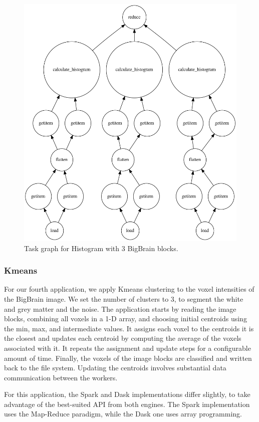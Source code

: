 \documentclass[conference]{IEEEtran}
\begin{document}
\begin{figure}[!hb]
	\centering
	\includegraphics[height=\columnwidth,
	angle=0]{figures/histogram.png}
	\caption{Task graph for Histogram with 3 BigBrain blocks.}
	\label{fig:graph-histogram}
\end{figure}
	
\subsubsection{Kmeans}
For our fourth application, we apply Kmeans clustering to the voxel intensities of the BigBrain image.
We set the number of clusters to 3, to segment the white and grey matter and the noise.
The application starts by reading the image blocks, combining all voxels in a 1-D array, and choosing initial centroids using the min, max, and intermediate values.
It assigns each voxel to the centroids it is the closest and updates each centroid by computing the average of the voxels associated with it. 
It repeats the assignment and update steps for a configurable amount of time. 
Finally, the voxels of the image blocks are classified and written back to the file system.
Updating the centroids involves substantial data communication between the workers.

For this application, the Spark and Dask implementations differ slightly,  to take advantage of the best-suited API from both engines.
The Spark implementation uses the Map-Reduce paradigm, while the Dask one uses array programming.
	
\end{document}
